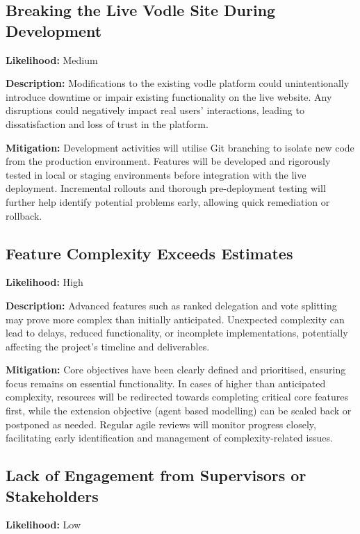 \subsection*{Breaking the Live Vodle Site During Development}

\textbf{Likelihood:} Medium

\textbf{Description:} Modifications to the existing vodle platform could unintentionally introduce downtime or impair existing functionality on the live website. Any disruptions could negatively impact real users' interactions, leading to dissatisfaction and loss of trust in the platform.

\textbf{Mitigation:} Development activities will utilise Git branching to isolate new code from the production environment. Features will be developed and rigorously tested in local or staging environments before integration with the live deployment. Incremental rollouts and thorough pre-deployment testing will further help identify potential problems early, allowing quick remediation or rollback.

\subsection*{Feature Complexity Exceeds Estimates}

\textbf{Likelihood:} High

\textbf{Description:} Advanced features such as ranked delegation and vote splitting may prove more complex than initially anticipated. Unexpected complexity can lead to delays, reduced functionality, or incomplete implementations, potentially affecting the project's timeline and deliverables.

\textbf{Mitigation:} Core objectives have been clearly defined and prioritised, ensuring focus remains on essential functionality. In cases of higher than anticipated complexity, resources will be redirected towards completing critical core features first, while the extension objective (agent based modelling) can be scaled back or postponed as needed. Regular agile reviews will monitor progress closely, facilitating early identification and management of complexity-related issues.

\subsection*{Lack of Engagement from Supervisors or Stakeholders}

\textbf{Likelihood:} Low

